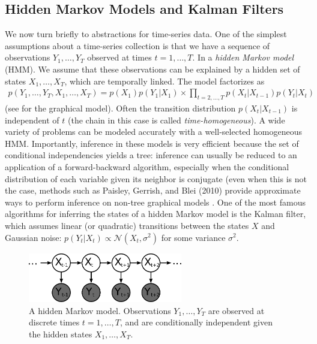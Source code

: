 \subsection{Hidden Markov Models and Kalman Filters}
We now turn briefly to abstractions for time-series data. One of the
simplest assumptions about a time-series collection is that we have a
sequence of observations $Y_1, \ldots, Y_T$ observed at times $t=1,
\ldots, T$.  In a \emph{hidden Markov model} (HMM).  We assume that
these observations can be explained by a hidden set of states $X_1,
\ldots, X_T$, which are temporally linked.  The model factorizes as
\begin{align}
  p(Y_1, \ldots, Y_T, X_1, \ldots, X_T) = p(X_1) p(Y_1 | X_1) \times \prod_{t=2, \ldots, T} p(X_t | X_{t-1}) p(Y_t | X_t)
\end{align}
(see  for the graphical model).  Often the transition
distribution $p(X_t | X_{t-1})$ is independent of $t$ (the chain in
this case is called \emph{time-homogeneous}).  A wide variety of
problems can be modeled accurately with a well-selected homogeneous
HMM.  Importantly, inference in these models is very efficient because
the set of conditional independencies yields a tree: inference can
usually be reduced to an application of a forward-backward algorithm,
especially when the conditional distribution of each variable given
its neighbor is conjugate (even when this is not the case, methods
such as Paisley, Gerrish, and Blei (2010) provide approximate ways to
perform inference on non-tree graphical models \nocite{paisley:2010}.
One of the most famous algorithms for inferring the states of a hidden
Markov model is the Kalman filter, which assumes linear (or quadratic)
transitions between the states $X$ and Gaussian noise: $p(Y_t | X_t)
\propto \mathcal{N}(X_t, \sigma^2)$ for some variance $\sigma^2$.
\begin{figure}
  \begin{center}
  \includegraphics[width=0.6\textwidth]{chapter_introductory_material/figs/hmm_gm.pdf}
  \end{center}
  \caption{A hidden Markov model.  Observations $Y_1, \ldots, Y_T$ are observed at discrete times $t=1, \ldots, T$, and are conditionally independent given the hidden states $X_1, \ldots, X_T$.}
  \label{fig:hmm_gm}
\end{figure}

